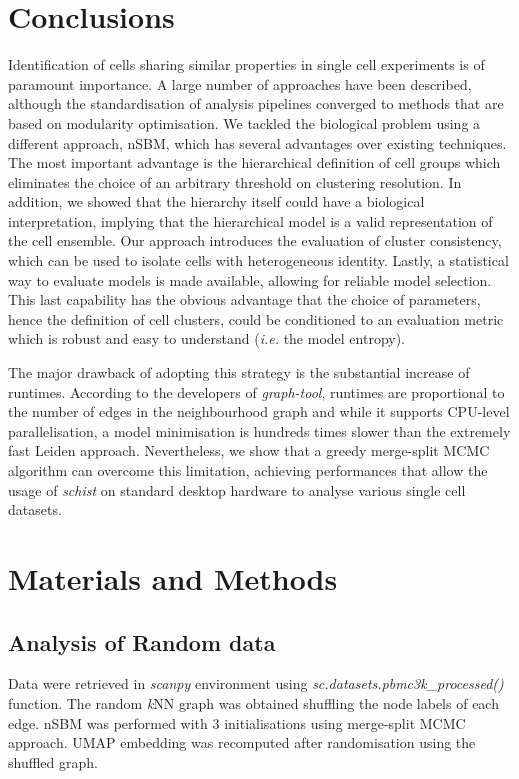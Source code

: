 \documentclass[10pt]{article}
\begin{document}
\section*{Conclusions}

Identification of cells sharing similar properties in single cell experiments is of paramount importance. A large number of approaches have been described, although the standardisation of analysis pipelines converged to methods that are based on modularity optimisation. We tackled the biological problem using a different approach, nSBM, which has several advantages over existing techniques. The most important advantage is the hierarchical definition of cell groups which eliminates the choice of an arbitrary threshold on clustering resolution. In addition, we showed that the hierarchy itself could have a biological interpretation, implying that the hierarchical model is a valid representation of the cell ensemble. Our approach introduces the evaluation of cluster consistency, which can be used to isolate cells with heterogeneous identity. Lastly, a statistical way to evaluate models is made available, allowing for reliable model selection. This last capability has the obvious advantage that the choice of parameters, hence the definition of cell clusters, could be conditioned to an evaluation metric which is robust and easy to understand (\emph{i.e.} the model entropy).

The major drawback of adopting this strategy is the substantial increase of runtimes. According to the developers of \emph{graph-tool}, runtimes are proportional to the number of edges in the neighbourhood graph and while it supports CPU-level parallelisation, a model minimisation is hundreds times slower than the extremely fast Leiden approach. Nevertheless, we show that a greedy merge-split MCMC algorithm can overcome this limitation, achieving performances that allow the usage of \emph{schist} on standard desktop hardware to analyse various single cell datasets.


\section*{Materials and Methods}

\subsection*{Analysis of Random data}
Data were retrieved in \emph{scanpy} environment using \emph{sc.datasets.pbmc3k\_processed()} function. The random \emph{k}NN graph was obtained shuffling the node labels of each edge. nSBM was performed with 3 initialisations using merge-split MCMC approach. UMAP embedding was recomputed after randomisation using the shuffled graph.
\end{document}
